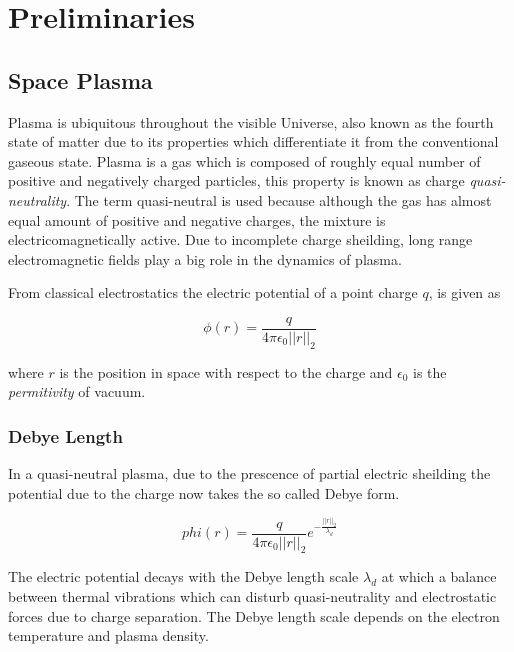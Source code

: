 \chapter{Preliminaries}\label{chapter:preliminaries}

\section{Space Plasma}\label{sec:plasma}

Plasma is ubiquitous throughout the visible Universe, also known as the fourth state of matter 
due to its properties which differentiate it from the conventional gaseous state. Plasma is a 
gas which is composed of roughly equal number of positive and negatively charged particles, this
property is known as charge \emph{quasi-neutrality}. The term quasi-neutral is used because although
the gas has almost equal amount of positive and negative charges, the mixture is electricomagnetically 
active. Due to incomplete charge sheilding, long range electromagnetic fields play a big role in the 
dynamics of plasma.

From classical electrostatics the electric potential of a point charge $q$, is given as

\begin{equation}
    \phi(r) = \frac{q}{4\pi\epsilon_0 ||r||_2}
\end{equation}

where $r$ is the position in space with respect to the charge and $\epsilon_0$ is the \emph{permitivity} of vacuum.

\subsection*{Debye Length}

In a quasi-neutral plasma, due to the prescence of partial electric sheilding the potential due to the charge 
now takes the so called Debye form.

\begin{equation}
    phi(r) = \frac{q}{4\pi\epsilon_0 ||r||_2} e^{-\frac{||r||_2}{\lambda_d}}
\end{equation}

The electric potential decays with the Debye length scale $\lambda_d$ at which a balance between thermal vibrations 
which can disturb quasi-neutrality and electrostatic forces due to charge separation. The Debye length scale depends
on the electron temperature and plasma density.

